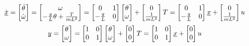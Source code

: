 \documentclass{report}
\begin{document}
\begin{onehalfspacing}
\begin{flushleft}
\vspace{-0.1in}
\[\dot{\underbar{\(x\)}} = \begin{bmatrix}
    \dot{\theta} \\
    \dot{\omega}  \end{bmatrix} = \begin{bmatrix}
    \omega \\
    -\frac{g}{L} \theta + \frac{T}{mL^2}
\end{bmatrix} = \begin{bmatrix}
    0 & 1\\
    -\frac{g}{L} & 0
\end{bmatrix} \begin{bmatrix}
    \theta \\
    \omega  \end{bmatrix} + \begin{bmatrix}
        0 \\
        \frac{1}{mL^2}  \end{bmatrix} T = \begin{bmatrix}
            0 & 1\\
            -\frac{g}{L} & 0
        \end{bmatrix} \underbar{\(x\)} + \begin{bmatrix}
                0 \\
                \frac{1}{mL^2}  \end{bmatrix} u\]
\[\underbar{\(y\)} = \begin{bmatrix}
    \theta \\
    \omega  \end{bmatrix} = \begin{bmatrix}
        1 & 0\\
        0 & 1
    \end{bmatrix} \begin{bmatrix}
        \theta \\
        \omega  \end{bmatrix} + \begin{bmatrix}
            0 \\
            0  \end{bmatrix} T = \begin{bmatrix}
                1 & 0\\
                0 & 1
            \end{bmatrix} \underbar{\(x\)} + \begin{bmatrix}
                    0 \\
                    0  \end{bmatrix} u\]


\end{flushleft}
\end{onehalfspacing}
\end{document}
